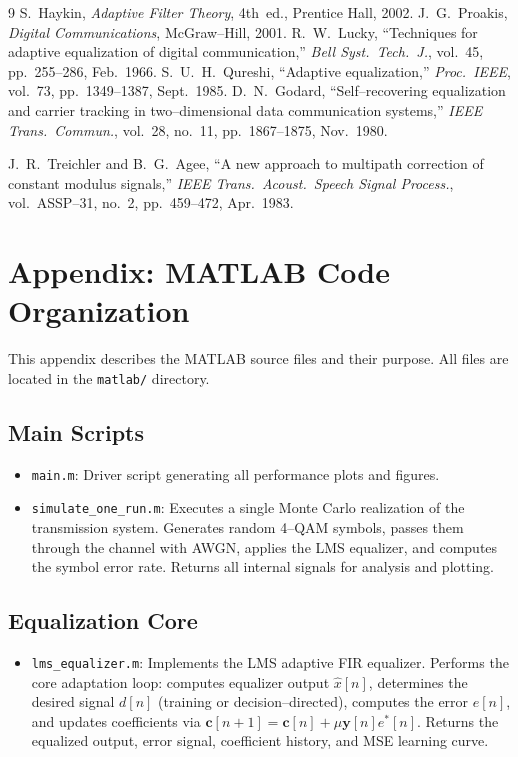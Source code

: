 \documentclass[12pt]{article}
\begin{document}
\begin{thebibliography}{9}
 S.~Haykin, \emph{Adaptive Filter Theory}, 4th~ed., Prentice Hall, 2002.
 J.~G.~Proakis, \emph{Digital Communications}, McGraw--Hill, 2001.
 R.~W.~Lucky, ``Techniques for adaptive equalization of digital communication,'' \emph{Bell Syst.\ Tech.\ J.}, vol.~45, pp.~255--286, Feb.~1966.
 S.~U.~H.~Qureshi, ``Adaptive equalization,'' \emph{Proc.\ IEEE}, vol.~73, pp.~1349--1387, Sept.~1985.
 D.~N.~Godard, ``Self--recovering equalization and carrier tracking in two--dimensional data communication systems,'' \emph{IEEE Trans.\ Commun.}, vol.~28, no.~11, pp.~1867--1875, Nov.~1980.

 J.~R.~Treichler and B.~G.~Agee, ``A new approach to multipath correction of constant modulus signals,'' \emph{IEEE Trans.\ Acoust.\ Speech Signal Process.}, vol.~ASSP--31, no.~2, pp.~459--472, Apr.~1983.
\end{thebibliography}

\appendix
\section*{Appendix: MATLAB Code Organization}
This appendix describes the MATLAB source files and their purpose. All files are located in the \texttt{matlab/} directory.

\subsection*{Main Scripts}
\begin{itemize}
\item \texttt{main.m}: Driver script generating all performance plots and figures.
\item \texttt{simulate\_one\_run.m}: Executes a single Monte Carlo realization of the transmission system. Generates random 4--QAM symbols, passes them through the channel with AWGN, applies the LMS equalizer, and computes the symbol error rate. Returns all internal signals for analysis and plotting.
\end{itemize}

\subsection*{Equalization Core}
\begin{itemize}
\item \texttt{lms\_equalizer.m}: Implements the LMS adaptive FIR equalizer. Performs the core adaptation loop: computes equalizer output $\hat{x}[n]$, determines the desired signal $d[n]$ (training or decision--directed), computes the error $e[n]$, and updates coefficients via $\mathbf{c}[n+1] = \mathbf{c}[n] + \mu \mathbf{y}[n]e^*[n]$. Returns the equalized output, error signal, coefficient history, and MSE learning curve.
\end{itemize}
\end{document}
